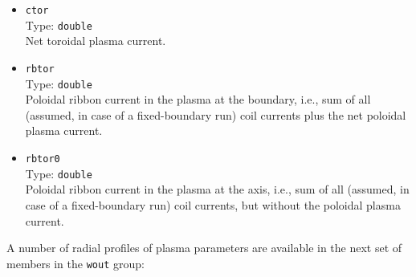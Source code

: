 \begin{itemize}
       Larmor radius of plasma ions.
 \item \texttt{ctor} \\
       Type: \texttt{double} \\
       Net toroidal plasma current.
 \item \texttt{rbtor} \\
       Type: \texttt{double} \\
       Poloidal ribbon current in the plasma at the boundary,
       i.e., sum of all (assumed, in case of a fixed-boundary run) coil currents
       plus the net poloidal plasma current.
 \item \texttt{rbtor0} \\
       Type: \texttt{double} \\
       Poloidal ribbon current in the plasma at the axis,
       i.e., sum of all (assumed, in case of a fixed-boundary run) coil currents,
       but without the poloidal plasma current.
\end{itemize}
%
A number of radial profiles of plasma parameters are available
in the next set of members in the \texttt{wout} group:

